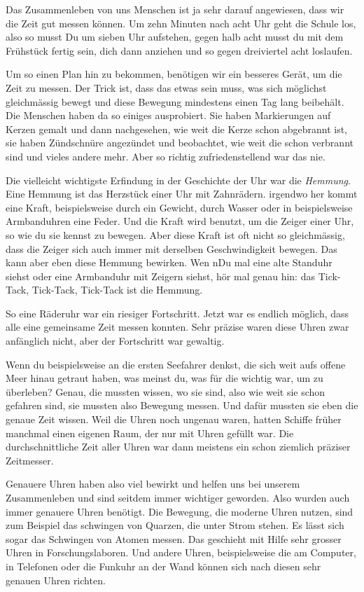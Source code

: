 Das Zusammenleben von uns Menschen ist ja sehr darauf angewiesen, dass wir die
Zeit gut messen können. Um zehn Minuten nach acht Uhr geht die Schule los, also so musst Du um
sieben Uhr aufstehen, gegen halb acht musst du mit dem Frühstück fertig sein,
dich dann anziehen und so gegen dreiviertel acht loslaufen. 

Um so einen Plan hin zu bekommen, benötigen wir ein besseres Gerät, um die Zeit zu messen. Der Trick ist,
dass das etwas sein muss, was sich möglichst gleichmässig bewegt und diese
Bewegung mindestens einen Tag lang beibehält. Die Menschen haben da so einiges
ausprobiert. Sie haben Markierungen auf Kerzen gemalt und dann nachgesehen, wie
weit die Kerze schon abgebrannt ist, sie haben Zündschnüre angezündet und
beobachtet, wie weit die schon verbrannt sind und vieles andere mehr. Aber so
richtig zufriedenstellend war das nie.

Die vielleicht wichtigste Erfindung in der Geschichte der Uhr war die
\textit{Hemmung}. Eine Hemmung ist das Herzstück einer Uhr mit Zahnrädern.
irgendwo her kommt eine Kraft, beispielsweise durch ein Gewicht, durch Wasser
oder in beispielsweise Armbanduhren eine Feder. Und die Kraft wird benutzt, um
die Zeiger einer Uhr, so wie du sie kennst zu bewegen. Aber diese Kraft ist oft
nicht so gleichmässig, dass die Zeiger sich auch immer mit derselben
Geschwindigkeit bewegen. Das kann aber eben diese Hemmung bewirken. Wen nDu mal
eine alte Standuhr siehst oder eine Armbanduhr mit Zeigern siehst, hör mal
genau hin: das Tick-Tack, Tick-Tack, Tick-Tack ist die Hemmung. 

So eine Räderuhr war ein riesiger Fortschritt. Jetzt war es endlich möglich,
dass alle eine gemeinsame Zeit messen konnten. Sehr präzise waren diese Uhren
zwar anfänglich nicht, aber der Fortschritt war gewaltig.

Wenn du beispielsweise an die ersten Seefahrer denkst, die sich weit aufs
offene Meer hinau getraut haben, was meinst du, was für die wichtig war, um zu
überleben? Genau, die mussten wissen, wo sie sind, also wie weit sie schon
gefahren sind, sie mussten also Bewegung messen. Und dafür mussten sie eben die
genaue Zeit wissen. Weil die Uhren noch ungenau waren, hatten Schiffe früher
manchmal einen eigenen Raum, der nur mit Uhren gefüllt war. Die
durchschnittliche Zeit aller Uhren war dann meistens ein schon ziemlich
präziser Zeitmesser.

Genauere Uhren haben also viel bewirkt und helfen uns bei unserem Zusammenleben
und sind seitdem immer wichtiger geworden. Also wurden auch immer genauere
Uhren benötigt. Die Bewegung, die moderne Uhren nutzen, sind zum Beispiel das
schwingen von Quarzen, die unter Strom stehen. Es lässt sich sogar das
Schwingen von Atomen messen. Das geschieht mit Hilfe sehr grosser Uhren in
Forschungslaboren. Und andere Uhren, beispielsweise die am Computer, in
Telefonen oder die Funkuhr an der Wand können sich nach diesen sehr genauen
Uhren richten. 

